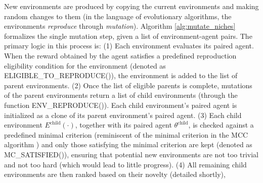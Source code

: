 \documentclass{article}
\newcommand{\jc}[1]{\comments{\textcolor{deepForestGreen}{[JC: #1]}}}
\newcommand{\ks}[1]{\comments{\textcolor{purple}{[Ken: #1]}}}
\newcommand{\rw}[1]{\comments{\textcolor{blue}{[Rui: #1]}}}
\newcommand{\comments}[1]{#1}
\begin{document}
New environments are produced by copying the current environments and making random changes to them 
(in the language of evolutionary algorithms, the environments \emph{reproduce} through \emph{mutation}). 
Algorithm \ref{alg:mutate_niches}
formalizes the single mutation step, given a list of environment-agent pairs. The primary logic in this process is: (1) Each environment evaluates its paired agent. When the reward obtained by the agent satisfies a predefined reproduction eligibility condition for the environment (denoted as ELIGIBLE\_TO\_REPRODUCE()), the environment is added to the list of parent environments.
(2) Once the list of eligible parents is complete, mutations of the parent environments return a list of child environments (through the function ENV\_REPRODUCE()). Each child environment's paired agent is initialized as a clone of its parent environment's paired agent.
(3) Each child environment $E^{\textrm{child}}(\cdot)$, together with its paired agent $\theta^{\textrm{child}}$, is checked against a predefined minimal criterion (reminiscent of the minimal criterion in the MCC algorithm \cite{brant:mcc17}) and only those satisfying the minimal criterion are kept (denoted as MC\_SATISFIED()), ensuring that potential new environments are not too trivial and not too hard (which would lead to little progress). 
(4) All remaining child environments are then ranked based on their novelty (detailed shortly), %
\end{document}
